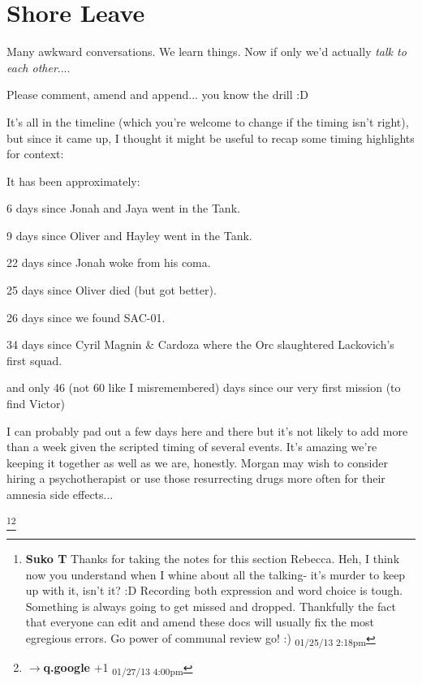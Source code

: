 \setcounter{chapter}{ 13 }
\chapter{\textbf{Shore Leave} }








Many awkward conversations.  We learn things.  Now if only we'd actually \textit{talk to each other}....



Please comment, amend and append... you know the drill :D






It's all in the timeline (which you're welcome to change if the timing isn't right), but since it came up, I thought it might be useful to recap some timing highlights for context:



It has been approximately:

6 days since Jonah and Jaya went in the Tank.  

9 days since Oliver and Hayley went in the Tank.

22 days since Jonah woke from his coma.

25 days since Oliver died (but got better).

26 days since we found SAC-01.  

34 days since Cyril Magnin \& Cardoza where the Orc slaughtered Lackovich's first squad. 

and only 46 (not 60 like I misremembered) days since our very first mission (to find Victor)



I can probably pad out a few days here and there but it's not likely to add more than a week given the scripted timing of several events.  It's amazing we're keeping it together as well as we are, honestly.  Morgan may wish to consider hiring a psychotherapist or use those resurrecting drugs more often for their amnesia side effects...





\footnote{\textbf{Suko T }Thanks for taking the notes for this section Rebecca.   Heh, I think now you understand when I whine about all the talking- it's murder to keep up with it, isn't it? :D  Recording both expression and word choice is tough.  Something is always going to get missed and dropped.  Thankfully the fact that everyone can edit and amend these docs will usually fix the most egregious errors.  Go power of communal review go! :) \textsubscript{01/25/13 2:18pm}}\footnote{$\rightarrow$\textbf{q.google }+1 \textsubscript{01/27/13 4:00pm}}

